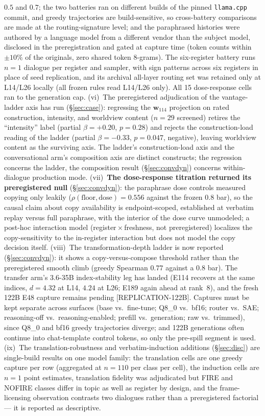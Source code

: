 \documentclass[10pt,a4paper,twocolumn]{article}
\newcommand{\wvec}{\mathbf{w}_{114}}
\begin{document}
$0.5$ and $0.7$; the two batteries ran on different builds of the pinned
\texttt{llama.cpp} commit, and greedy trajectories are build-sensitive, so
cross-battery comparisons are made at the routing-signature level; and the
paraphrased histories were authored by a language model from a different
vendor than the subject model, disclosed in the preregistration and gated at
capture time (token counts within $\pm 10\%$ of the originals, zero shared
token 8-grams). The six-register battery runs $n{=}1$ dialogue per register
and sampler, with sign patterns across six registers in place of seed
replication, and its archival all-layer routing set was retained only at
L14/L26 locally (all frozen rules read L14/L26 only). All 15 dose-response
cells ran to the generation cap.
(vi)~The preregistered adjudication of the vantage-ladder axis has run
(\S\ref{sec:case}): regressing the $\wvec$ projection on rated construction,
intensity, and worldview content ($n{=}29$ screened) retires the ``intensity''
label (partial $\beta{=}{+}0.20$, $p{=}0.28$) and rejects the
construction-load reading of the ladder (partial $\beta{=}{-}0.33$,
$p{=}0.047$, negative), leaving worldview content as the surviving axis. The
ladder's construction-load axis and the conversational arm's composition axis
are distinct constructs; the regression concerns the ladder, the composition
result (\S\ref{sec:convdyn}) concerns within-dialogue production mode.
(vii)~\textbf{The dose-response titration returned its preregistered null}
(\S\ref{sec:convdyn}): the paraphrase dose controls measured copying only
leakily ($\rho(\text{floor},\text{dose}){=}0.556$ against the frozen $0.8$
bar), so the causal claim about copy availability is endpoint-scoped,
established at verbatim replay versus full paraphrase, with the interior of
the dose curve unmodeled; a post-hoc interaction model
(register${}\times{}$freshness, not preregistered) localizes the
copy-sensitivity to the in-register interaction but does not model the copy
decision itself.
(viii)~The transformation-depth ladder is now reported
(\S\ref{sec:convdyn}): it shows a copy-versus-compose threshold rather than the
preregistered smooth climb (greedy Spearman $0.77$ against a $0.8$ bar). The
transfer arm's 3.6-35B index-stability leg has landed (E114 recovers at the
same indices, $d{=}4.32$ at L14, $4.24$ at L26; E189 again ahead at rank~8), and
the fresh 122B E48 capture remains pending [REPLICATION-122B]. Captures must be
kept
separate across surfaces (base vs.\ fine-tune; Q8\_0 vs.\ bf16; router vs.\
SAE; reasoning-off vs.\ reasoning-enabled; prefill vs.\ generation; raw vs.\
trimmed), since Q8\_0 and bf16 greedy trajectories diverge; and 122B
generations often continue into chat-template control tokens, so only the
pre-spill segment is used.
(ix)~The translation-robustness and verbatim-induction additions
(\S\ref{sec:disc}) are single-build results on one model family: the
translation cells are one greedy capture per row (aggregated at
$n{=}110$ per class per cell), the induction cells are $n{=}1$ point
estimates, translation fidelity was adjudicated but FIRE and NOFIRE classes
differ in topic as well as register by design, and the frame-licensing
observation contrasts two dialogues rather than a preregistered factorial ---
it is reported as descriptive.
\end{document}
